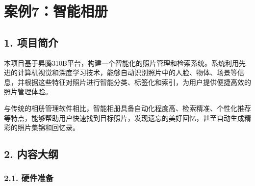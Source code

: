 \chapter{案例7：智能相册}\label{ux6848ux4f8b7ux667aux80fdux76f8ux518c}

\section{1. 项目简介}\label{ux9879ux76eeux7b80ux4ecb}

本项目基于昇腾310B平台，构建一个智能化的照片管理和检索系统。系统利用先进的计算机视觉和深度学习技术，能够自动识别照片中的人脸、物体、场景等信息，并根据这些特征对照片进行智能分类、标签化和索引，为用户提供便捷高效的照片管理体验。

与传统的相册管理软件相比，智能相册具备自动化程度高、检索精准、个性化推荐等特点，能够帮助用户快速找到目标照片，发现遗忘的美好回忆，甚至自动生成精彩的照片集锦和回忆录。

\section{2. 内容大纲}\label{ux5185ux5bb9ux5927ux7eb2}

\subsection{2.1. 硬件准备}\label{ux786cux4ef6ux51c6ux5907}

